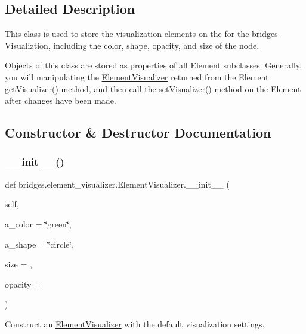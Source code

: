 \subsection{Detailed Description}
This class is used to store the visualization elements on the for the bridges Visualiztion, including the color, shape, opacity, and size of the node. 

Objects of this class are stored as properties of all Element subclasses. Generally, you will manipulating the \mbox{\hyperlink{classbridges_1_1element__visualizer_1_1_element_visualizer}{Element\+Visualizer}} returned from the Element get\+Visualizer() method, and then call the set\+Visualizer() method on the Element after changes have been made. 

\subsection{Constructor \& Destructor Documentation}
\mbox{\label{classbridges_1_1element__visualizer_1_1_element_visualizer_ac1d0a9aad14cb2fe50aa0d8025256e3b}} 
\subsubsection{\texorpdfstring{\+\_\+\+\_\+init\+\_\+\+\_\+()}{\_\_init\_\_()}}
{\footnotesize\ttfamily def bridges.\+element\+\_\+visualizer.\+Element\+Visualizer.\+\_\+\+\_\+init\+\_\+\+\_\+ (\begin{DoxyParamCaption}\item[{}]{self,  }\item[{}]{a\+\_\+color = {\ttfamily \char`\"{}green\char`\"{}},  }\item[{}]{a\+\_\+shape = {\ttfamily \char`\"{}circle\char`\"{}},  }\item[{}]{size = {},  }\item[{}]{opacity = {} }\end{DoxyParamCaption})}



Construct an \mbox{\hyperlink{classbridges_1_1element__visualizer_1_1_element_visualizer}{Element\+Visualizer}} with the default visualization settings. 


